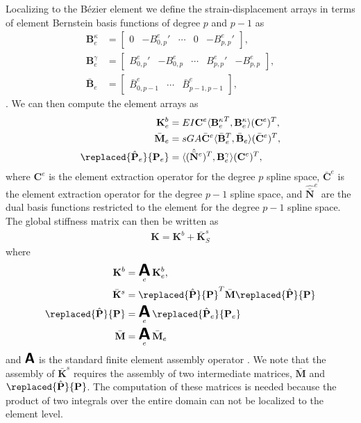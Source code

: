 \documentclass{article}
\DeclareMathOperator*{\A}{ \mathlarger{\mathlarger{\mathlarger{\boldsymbol{\mathsf{A}}}}} }
\begin{document}
Localizing to the B\'{e}zier element we define the strain-displacement arrays in terms of element Bernstein basis functions of degree $p$ and $p-1$ as
\begin{align}
	\mathbf{B}_e^\kappa 
    	&= \begin{bmatrix} 0 & -{B^e_{0,p}}' & \cdots & 0 & -{B^e_{p,p}}' \end{bmatrix}, \\
    \mathbf{B}_e^\gamma
    	&= \begin{bmatrix} {B^e_{0,p}}' & -B^e_{0,p} & \cdots & {B^e_{p,p}}' & -B^e_{p,p} \end{bmatrix}, \\
    \bar{\mathbf{B}}_e
    	&= \begin{bmatrix} \bar{B}^e_{0,p-1} & \cdots & \bar{B}^e_{p-1,p-1} \end{bmatrix},
\end{align}
. We can then compute the element arrays as
\begin{align}
\mathbf{K}_e^b &= EI\mathbf{C}^e\langle{{\mathbf{B}_e^\kappa}^T,\mathbf{B}_e^\kappa}\rangle(\mathbf{C}^e)^T, \label{eq:symmetric_timoshenko}\\
\bar{\mathbf{M}}_e &= s{GA}\bar{\mathbf{C}}^e\langle{\bar{\mathbf{B}}_e^T,\bar{\mathbf{B}}_e}\rangle(\bar{\mathbf{C}}^e)^T, \\
\replaced{\hat{\mathbf{P}}_e}{\mathbf{P}_e} &= \langle{(\hat{\bar{\mathbf{N}}}^e)^T,\mathbf{B}^\gamma_e}\rangle(\mathbf{C}^e)^T,
\end{align}
where $\mathbf{C}^e$ is the element extraction operator for the degree $p$ spline space, $\bar{\mathbf{C}}^e$ is the element extraction operator for the degree $p-1$ spline space, and $\hat{\bar{\mathbf{N}}}^e$ are the dual basis functions restricted to the element for the degree $p-1$ spline space. The global stiffness matrix can then be written as
\begin{align}
	\mathbf{K} = \mathbf{K}^b + \bar{\mathbf{K}}^s_S
\end{align}
where
\begin{align}
	\mathbf{K}^b &=\A_e\mathbf{K}_e^b,\label{eqn:bending_stiffness} \\
	\bar{\mathbf{K}}^s&=\replaced{\hat{\mathbf{P}}}{\mathbf{P}}^T\bar{\mathbf{M}}\replaced{\hat{\mathbf{P}}}{\mathbf{P}}\label{eqn:shear_stiffness} \\
	\replaced{\hat{\mathbf{P}}}{\mathbf{P}} &=\A_e\replaced{\hat{\mathbf{P}}_e}{\mathbf{P}_e} \\
    \bar{\mathbf{M}} &=\A_e\bar{\mathbf{M}}_e
\end{align}
and $\A$ is the standard finite element assembly operator \cite{hughes_finite_2012}. We note that the assembly of $\bar{\mathbf{K}}^s$ requires the assembly of two intermediate matrices, $\bar{\mathbf{M}}$ and $\replaced{\hat{\mathbf{P}}}{\mathbf{P}}$. The computation of these matrices is needed because the product of two integrals over the entire domain can not be localized to the element level.
\end{document}
